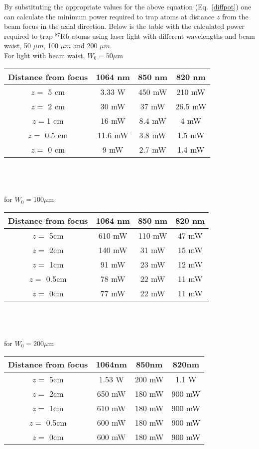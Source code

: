 \documentclass[amssymb,amsmath,aps,prl,twocolumn]{revtex4}
\begin{document}
By substituting the appropriate values for the above equation
(Eq.~\ref{diffpot}) one can calculate the minimum power required
to trap atoms at distance $z$ from the beam focus in the axial
direction. Below is the table with the calculated power required
to trap $^{87}$Rb atoms using laser light with different
wavelengths and beam waist, 50 $\mu m$,
100 $\mu m$ and 200 $\mu m$.\\

For light with beam waist, $W_{0}=50 \mu$m \\

\begin{tabular}{|c|c|c|c|}
\hline
Distance from focus & 1064 nm & 850 nm & 820 nm\\
\hline
$z=$ 5 cm & 3.33 W & 450 mW & 210 mW\\
$z=$ 2 cm & 30 mW & 37 mW & 26.5 mW\\
$z=$1 cm & 16 mW & 8.4 mW & 4 mW\\
$z=$ 0.5 cm & 11.6 mW & 3.8 mW & 1.5 mW\\
$z=$ 0 cm & 9 mW  & 2.7 mW & 1.4 mW\\
\hline
\end{tabular}\\
\\
\\
for $W_{0}=100 \mu$m \\

\begin{tabular}{|c|c|c|c|}
\hline
Distance from focus & 1064 nm & 850 nm & 820 nm\\
\hline
$z=$ 5cm & 610 mW & 110 mW & 47 mW\\
$z=$ 2cm & 140 mW & 31 mW & 15 mW\\
$z=$ 1cm & 91 mW & 23 mW & 12 mW\\
$z=$ 0.5cm & 78 mW & 22 mW & 11 mW\\
$z=$ 0cm & 77 mW  & 22 mW & 11 mW\\
\hline
\end{tabular}\\
\\
\\
for $W_{0}=200 \mu$m \\

\begin{tabular}{|c|c|c|c|}
\hline
Distance from focus & 1064nm & 850nm & 820nm\\
\hline
$z=$ 5cm & 1.53 W & 200 mW & 1.1 W\\
$z=$ 2cm & 650 mW & 180 mW & 900 mW\\
$z=$ 1cm & 610 mW & 180 mW & 900 mW\\
$z=$ 0.5cm & 600 mW & 180 mW & 900 mW\\
$z=$ 0cm & 600 mW  & 180 mW & 900 mW\\
\hline
\end{tabular}\\
\end{document}
